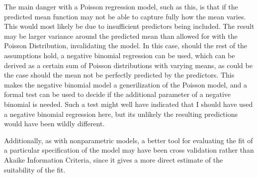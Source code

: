 \documentclass[11pt]{article}
\theoremstyle{definition}
\begin{document}
The main danger with a Poisson regression model, such as this, is that if the predicted mean function may not be able to capture fully how the mean varies. This would most likely be due to insufficient predictors being included. The result may be larger variance around the predicted mean than allowed for with the Poisson Distribution, invalidating the model. In this case, should the rest of the assumptions hold, a negative binomial regression can be used, which can be derived as a certain sum of Poisson distributions with varying means, as could be the case should the mean not be perfectly predicted by the predictors. This makes the negative binomial model a generilization of the Poisson model, and a formal test can be used to decide if the additional parameter of a negative binomial is needed. Such a test might well have indicated that I should have used a negative binomial regression here, but its unlikely the resulting predictions would have been wildly different. \par
Additionally, as with nonparametric models, a better tool for evaluating the fit of a particular specification of the model may have been cross validation rather than Akaike Information Criteria, since it gives a more direct estimate of the suitability of the fit. 
\end{document}
